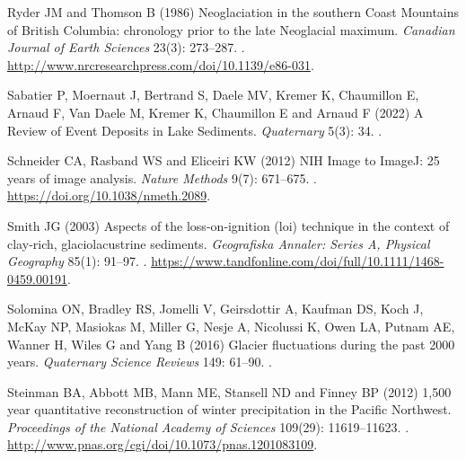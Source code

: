 \documentclass[Royal,times,doublespace,sageh]{sagej}
\begin{document}
\begin{thebibliography}{69}
{
Ryder JM and Thomson B (1986) {Neoglaciation in the southern Coast Mountains of
  British Columbia: chronology prior to the late Neoglacial maximum}.
\newblock \emph{Canadian Journal of Earth Sciences} 23(3): 273--287.
\newblock {}.
\newblock \urlprefix\url{http://www.nrcresearchpress.com/doi/10.1139/e86-031}.

Sabatier P, Moernaut J, Bertrand S, Daele MV, Kremer K, Chaumillon E, Arnaud F,
  {Van Daele} M, Kremer K, Chaumillon E and Arnaud F (2022) {A Review of Event
  Deposits in Lake Sediments}.
\newblock \emph{Quaternary} 5(3): 34.
\newblock {}.

Schneider CA, Rasband WS and Eliceiri KW (2012) {NIH Image to ImageJ: 25 years
  of image analysis}.
\newblock \emph{Nature Methods} 9(7): 671--675.
\newblock {}.
\newblock \urlprefix\url{https://doi.org/10.1038/nmeth.2089}.

Smith JG (2003) {Aspects of the loss‐on‐ignition (loi) technique in the
  context of clay‐rich, glaciolacustrine sediments}.
\newblock \emph{Geografiska Annaler: Series A, Physical Geography} 85(1):
  91--97.
\newblock {}.
\newblock
  \urlprefix\url{https://www.tandfonline.com/doi/full/10.1111/1468-0459.00191}.

Solomina ON, Bradley RS, Jomelli V, Geirsdottir A, Kaufman DS, Koch J, McKay
  NP, Masiokas M, Miller G, Nesje A, Nicolussi K, Owen LA, Putnam AE, Wanner H,
  Wiles G and Yang B (2016) {Glacier fluctuations during the past 2000 years}.
\newblock \emph{Quaternary Science Reviews} 149: 61--90.
\newblock {}.

Steinman BA, Abbott MB, Mann ME, Stansell ND and Finney BP (2012) {1,500 year
  quantitative reconstruction of winter precipitation in the Pacific
  Northwest}.
\newblock \emph{Proceedings of the National Academy of Sciences} 109(29):
  11619--11623.
\newblock {}.
\newblock \urlprefix\url{http://www.pnas.org/cgi/doi/10.1073/pnas.1201083109}.

}
\end{thebibliography}
\end{document}
